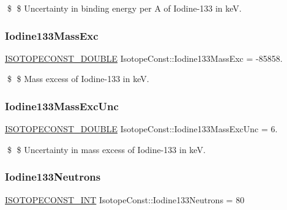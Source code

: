 \$ \$ Uncertainty in binding energy per A of Iodine-\/133 in keV. \mbox{\label{group___isotope_const-_iodine-_i133_ga0c9a6970706589a3161eb71ffa1d6a9d}} 
\subsubsection{\texorpdfstring{Iodine133\+Mass\+Exc}{Iodine133MassExc}}
{\footnotesize\ttfamily \mbox{\hyperlink{group___isotope_const-_macros_ga8f45a7272ce02c0b4c65c44636ed719a}{I\+S\+O\+T\+O\+P\+E\+C\+O\+N\+S\+T\+\_\+\+D\+O\+U\+B\+LE}} Isotope\+Const\+::\+Iodine133\+Mass\+Exc = -\/85858.}

\$ \$ Mass excess of Iodine-\/133 in keV. \mbox{\label{group___isotope_const-_iodine-_i133_gacd2341cccc36c279494010fb2303a46e}} 
\subsubsection{\texorpdfstring{Iodine133\+Mass\+Exc\+Unc}{Iodine133MassExcUnc}}
{\footnotesize\ttfamily \mbox{\hyperlink{group___isotope_const-_macros_ga8f45a7272ce02c0b4c65c44636ed719a}{I\+S\+O\+T\+O\+P\+E\+C\+O\+N\+S\+T\+\_\+\+D\+O\+U\+B\+LE}} Isotope\+Const\+::\+Iodine133\+Mass\+Exc\+Unc = 6.}

\$ \$ Uncertainty in mass excess of Iodine-\/133 in keV. \mbox{\label{group___isotope_const-_iodine-_i133_ga1034ce0f098ccaec6f2ca2071678845d}} 
\subsubsection{\texorpdfstring{Iodine133\+Neutrons}{Iodine133Neutrons}}
{\footnotesize\ttfamily \mbox{\hyperlink{group___isotope_const-_macros_ga5f18360b3e99483a35c32d789e62621c}{I\+S\+O\+T\+O\+P\+E\+C\+O\+N\+S\+T\+\_\+\+I\+NT}} Isotope\+Const\+::\+Iodine133\+Neutrons = 80}

